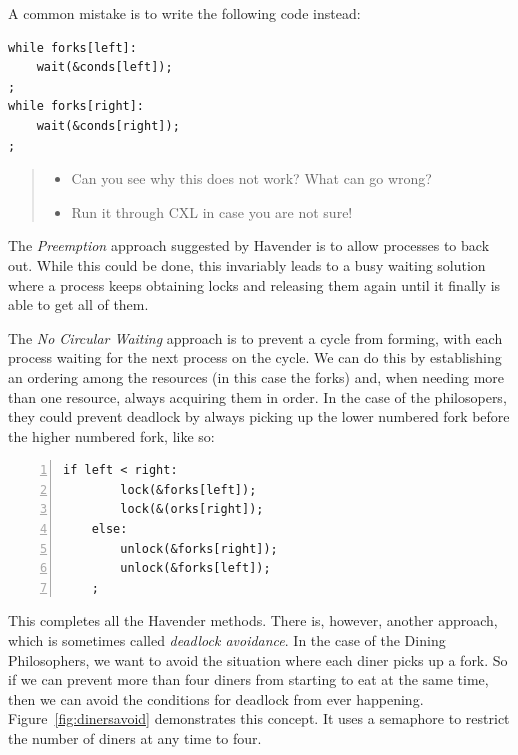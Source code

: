 \documentclass{report}
\newenvironment{code}{
\tcolorbox
}{
\endtcolorbox
}
\begin{document}
A common mistake is to write the following code instead:

\begin{code}
\begin{Verbatim}
while forks[left]:
    wait(&conds[left]);
;
while forks[right]:
    wait(&conds[right]);
;
\end{Verbatim}
\end{code}

\begin{quote}
\begin{itemize}
\item Can you see why this does not work?  What can go wrong?
\item Run it through CXL in case you are not sure!
\end{itemize}
\end{quote}

The \emph{Preemption} approach suggested by Havender is to allow processes to back out.
While this could be done, this invariably leads to a busy waiting solution
where a process keeps obtaining locks and releasing them again until it
finally is able to get all of them.

The \emph{No Circular Waiting} approach
is to prevent a cycle from forming, with each
process waiting for the next process on the cycle.
We can do this by establishing an ordering among the
resources (in this case the forks) and, when needing more than one
resource, always acquiring them in order.  In the case of the philosopers,
they could prevent deadlock by always picking up the lower numbered fork
before the higher numbered fork, like so:

\vspace{1em}
\begin{code}
\begin{Verbatim}[xleftmargin=5mm,numbers=left]
    if left < right:
        lock(&forks[left]);
        lock(&(orks[right]);
    else:
        unlock(&forks[right]);
        unlock(&forks[left]);
    ;
\end{Verbatim}
\end{code}
\vspace{1em}

This completes all the Havender methods.
There is, however, another approach, which is sometimes called
\emph{deadlock avoidance}.
In the case of the Dining Philosophers, we want to avoid the situation where each
diner picks up a fork.  So if we can prevent more than four diners from starting to
eat at the same time, then we can avoid the conditions for deadlock from ever
happening.
Figure~\ref{fig:dinersavoid} demonstrates this concept.  It uses a semaphore to
restrict the number of diners at any time to four.
\end{document}
